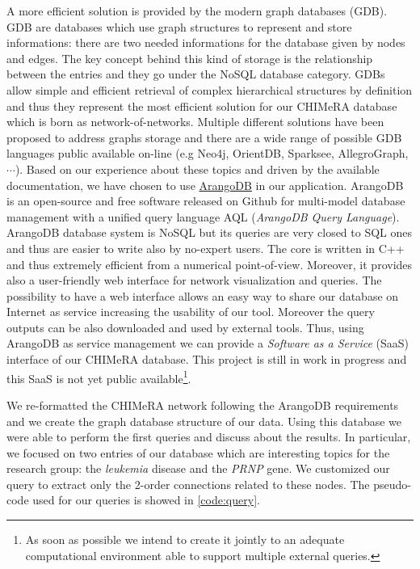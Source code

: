 \documentclass{standalone}
\begin{document}
A more efficient solution is provided by the modern graph databases (GDB).
GDB are databases which use graph structures to represent and store informations: there are two needed informations for the database given by nodes and edges.
The key concept behind this kind of storage is the relationship between the entries and they go under the \textsf{NoSQL} database category.
GDBs allow simple and efficient retrieval of complex hierarchical structures by definition and thus they represent the most efficient solution for our \textsf{CHIMeRA} database which is born as network-of-networks.
Multiple different solutions have been proposed to address graphs storage and there are a wide range of possible GDB languages public available on-line (e.g \textsf{Neo4j}, \textsf{OrientDB}, \textsf{Sparksee}, \textsf{AllegroGraph}, $\cdots$).
Based on our experience about these topics and driven by the available documentation, we have chosen to use \href{https://www.arangodb.com/}{\textsf{ArangoDB}} in our application.
\textsf{ArangoDB} is an open-source and free software released on Github for multi-model database management with a unified query language \textsf{AQL} (\emph{ArangoDB Query Language}).
\textsf{ArangoDB} database system is \textsf{NoSQL} but its queries are very closed to \textsf{SQL} ones and thus are easier to write also by no-expert users.
The core is written in \textsf{C++} and thus extremely efficient from a numerical point-of-view.
Moreover, it provides also a user-friendly web interface for network visualization and queries.
The possibility to have a web interface allows an easy way to share our database on Internet as service increasing the usability of our tool.
Moreover the query outputs can be also downloaded and used by external tools.
Thus, using \textsf{ArangoDB} as service management we can provide a \emph{Software as a Service} (SaaS) interface of our \textsf{CHIMeRA} database.
This project is still in work in progress and this SaaS is not yet public available\footnote{
  As soon as possible we intend to create it jointly to an adequate computational environment able to support multiple external queries.
}.

We re-formatted the \textsf{CHIMeRA} network following the \textsf{ArangoDB} requirements and we create the graph database structure of our data.
Using this database we were able to perform the first queries and discuss about the results.
In particular, we focused on two entries of our database which are interesting topics for the research group: the \emph{leukemia} disease and the \emph{PRNP} gene.
We customized our query to extract only the 2-order connections related to these nodes.
The pseudo-code used for our queries is showed in \ref{code:query}.
\end{document}

